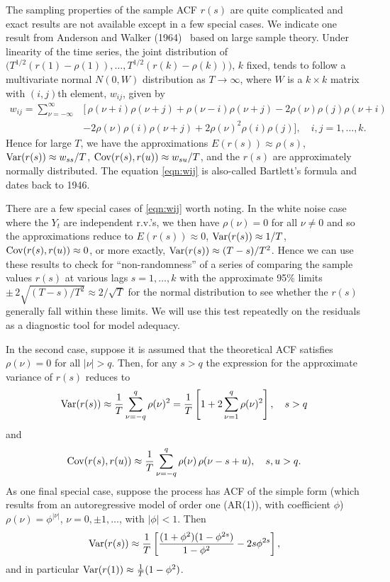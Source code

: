 The sampling properties of the sample ACF $r(s)$ are quite complicated and exact results are not available except in a few special cases. We indicate one result from Anderson and Walker (1964)~\cite{anderwalk} based on large sample theory. Under linearity of the time series, the joint distribution of $\big(T^{1/2} (r(1) - \rho(1) ), \ldots, T^{1/2} (r(k) - \rho(k) ) \big)$, $k$ fixed, tends to follow a multivariate normal $N(0, W)$ distribution as $T \to \infty$, where $W$ is a $k \times k$ matrix with $(i,j)$th element, $w_{ij}$, given by
	\begin{equation} \label{eqn:wij}
	\begin{split}
	w_{ij}= \sum_{\nu= -\infty}^\infty & [\, \rho(\nu + i ) \rho(\nu + j) + \rho(\nu - i) \rho(\nu + j) - 2 \rho(\nu) \rho(j) \rho(\nu + i)  \\
	&- 2 \rho(\nu) \rho(i) \rho(\nu + j) + 2 \rho(\nu)^2 \rho(i) \rho(j)], \quad  i, j= 1,\ldots, k.
        \end{split}
	\end{equation}
Hence for large $T$, we have the approximations $E(r(s)) \approx \rho(s)$, $\operatorname{Var}(r(s)) \approx w_{ss}/T$, $\operatorname{Cov}(r(s), r(u)) \approx w_{su}/T$, and the $r(s)$ are approximately normally distributed. The equation \eqref{eqn:wij} is also-called Bartlett's formula and dates back to 1946.


There are a few special cases of \eqref{eqn:wij} worth noting. In the white noise case where the $Y_t$ are independent r.v.'s, we then have $\rho(\nu)= 0$ for all $\nu \neq 0$ and so the approximations reduce to $E(r(s)) \approx 0$, $\operatorname{Var}(r(s)) \approx 1/T$, $\operatorname{Cov}(r(s), r(u)) \approx 0$, or more exactly, $\operatorname{Var}(r(s)) \approx (T-s)/T^2$. Hence we can use these results to check for ``non-randomness'' of a series of comparing the sample values $r(s)$ at various lags $s=1, \ldots, k$ with the approximate 95\% limits $\pm \, 2 \sqrt{(T-s)/T^2} \approx 2 / \sqrt{T}$ for the normal distribution to see whether the $r(s)$ generally fall within these limits. We will use this test repeatedly on the residuals as a diagnostic tool for model adequacy. 


In the second case, suppose it is assumed that the theoretical ACF satisfies $\rho(\nu) = 0$ for all $|\nu| > q$.  Then, for any $s > q$ the expression for the approximate variance of $r(s)$ reduces to
	\begin{equation} \label{eqn:varrs}
	\var(r(s)) \approx \dfrac{1}{T} \sum_{\nu=-q}^q \rho(\nu)^2= \dfrac{1}{T} \left[ 1 + 2 \sum_{\nu=1}^q \rho(\nu)^2 \right], \quad s > q 
	\end{equation}        
and
	\[
	\operatorname{Cov}(r(s), r(u)) \approx \frac{1}{T} \sum_{\nu = -q}^{q} \rho(\nu)\, \rho(\nu - s + u), \quad s,u > q.
	 \]
As one final special case, suppose the process  has ACF of the simple form (which results from an autoregressive model of order one (AR(1)), with coefficient $\phi$) $\rho(\nu) = \phi^{|\nu|}$, $\nu= 0, \pm 1, \ldots$, with $\lvert \phi \rvert < 1$. Then
	\[
	\operatorname{Var}(r(s)) \approx \frac{1}{T} \left[ \frac{(1 + \phi^2) (1 - \phi^{2s})}{1 - \phi^2} - 2s \phi^{2s} \right],
	\]
and in particular $\operatorname{Var}(r(1)) \approx \frac{1}{T} (1 - \phi^2)$.


